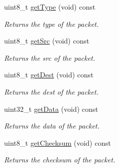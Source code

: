 \begin{DoxyCompactItemize}
uint8\+\_\+t \hyperlink{class_packet_affb425d99c0ff69cd5aa42cc0e22de2b}{get\+Type} (void) const
\begin{DoxyCompactList}\small\item\em Returns the type of the packet. \end{DoxyCompactList}\item 
uint8\+\_\+t \hyperlink{class_packet_a89ecf51f7edbf2677df7a5961f080b78}{get\+Src} (void) const
\begin{DoxyCompactList}\small\item\em Returns the src of the packet. \end{DoxyCompactList}\item 
uint8\+\_\+t \hyperlink{class_packet_ad60638eee5913cc40ac737d1bdeb216b}{get\+Dest} (void) const
\begin{DoxyCompactList}\small\item\em Returns the dest of the packet. \end{DoxyCompactList}\item 
uint32\+\_\+t \hyperlink{class_packet_a510ff2d5d2d28f275c26a90a7ae311d1}{get\+Data} (void) const
\begin{DoxyCompactList}\small\item\em Returns the data of the packet. \end{DoxyCompactList}\item 
uint8\+\_\+t \hyperlink{class_packet_aa529856197fdd79e6ca8cc86966cec10}{get\+Checksum} (void) const
\begin{DoxyCompactList}\small\item\em Returns the checksum of the packet. \end{DoxyCompactList}\end{DoxyCompactItemize}
